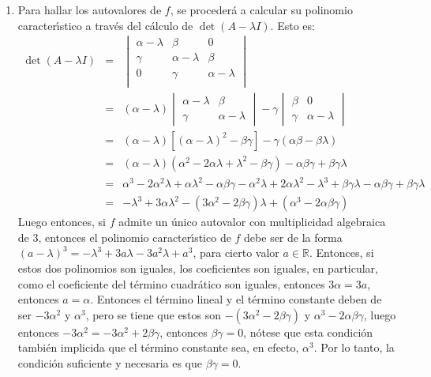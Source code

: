 \begin{solucion}
 $\phantom{0}$
 \begin{enumerate}[$a$)]
  \item Para hallar los autovalores de $f$, se proceder\'a a calcular su polinomio caracter\'{\i}stico a trav\'es del c\'alculo de $\det(A-\lambda I)$. Esto es:
  \begin{eqnarray*}
   \det(A - \lambda I) 
   & = & 
   \begin{vmatrix}
    \alpha - \lambda & \beta & 0  \\
    \gamma & \alpha - \lambda & \beta \\
    0 & \gamma & \alpha - \lambda \\
   \end{vmatrix}
   \\ 
   & = & 
   (\alpha -\lambda)
   \begin{vmatrix}
    \alpha - \lambda & \beta \\
    \gamma & \alpha - \lambda 
   \end{vmatrix}
   - \gamma 
   \begin{vmatrix}
    \beta & 0 \\
    \gamma & \alpha - \lambda 
   \end{vmatrix}
   \\
   & = & 
   (\alpha - \lambda)\left[ (\alpha - \lambda)^2 - \beta\gamma \right] 
   - \gamma (\alpha\beta - \beta\lambda) \\
   & = & 
   (\alpha - \lambda)(\alpha^2 -2\alpha\lambda + \lambda^2 - \beta\gamma) - \alpha\beta\gamma +\beta\gamma\lambda \\
   & = & 
   \alpha^3 - 2\alpha^2\lambda + \alpha\lambda^2 - \alpha\beta\gamma - \alpha^2\lambda + 2\alpha\lambda^2 - \lambda^3 + \beta\gamma\lambda - \alpha\beta\gamma + \beta\gamma\lambda \\
   & = & 
   -\lambda^3 + 3\alpha\lambda^2 - (3\alpha^2 - 2\beta\gamma)\lambda + (\alpha^3 - 2\alpha\beta\gamma)
  \end{eqnarray*}
  Luego entonces, si $f$ admite un \'unico autovalor con multiplicidad algebraica de 3, entonces el polinomio caracter\'{\i}stico de $f$ debe ser de la forma $(a - \lambda)^3 = -\lambda^3 + 3a\lambda - 3a^2\lambda + a^3$, para cierto valor $a\in \mathbb{R}$. Entonces, si estos dos polinomios son iguales, los coeficientes son iguales, en particular, como el coeficiente del t\'ermino cuadr\'atico son iguales, entonces $3\alpha = 3a$, entonces $a=\alpha$. Entonces el t\'ermino lineal y el t\'ermino constante deben de ser $-3\alpha^2$ y $\alpha^3$, pero se tiene que estos son $-(3\alpha^2-2\beta\gamma)$ y $\alpha^3 - 2\alpha\beta\gamma$, luego entonces $-3\alpha^2 = -3\alpha^2  + 2\beta\gamma$, entonces $\beta\gamma = 0$, n\'otese que esta condici\'on tambi\'en implicida que el t\'ermino constante sea, en efecto, $\alpha^3$. Por lo tanto, la condici\'on suficiente y necesaria es que $\beta\gamma = 0$.
  

\end{enumerate}
\end{solucion}
